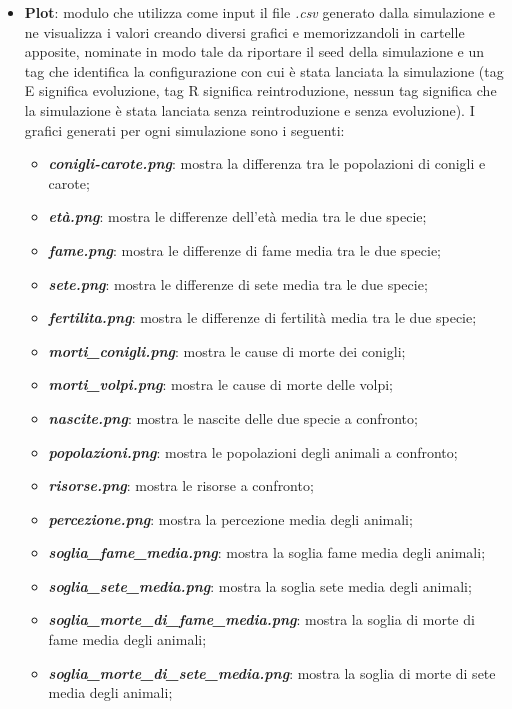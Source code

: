 \documentclass[11pt]{article}
\begin{document}
\begin{itemize}
    \item \textbf{Plot}: modulo che utilizza come input il file \textit{.csv} generato dalla simulazione e ne visualizza i valori creando diversi grafici e memorizzandoli in cartelle apposite, nominate in modo tale da riportare il seed della simulazione e un tag che identifica la configurazione con cui è stata lanciata la simulazione (tag E significa evoluzione, tag R significa reintroduzione, nessun tag significa che la simulazione è stata lanciata senza reintroduzione e senza evoluzione). I grafici generati per ogni simulazione sono i seguenti:
    \begin{itemize}
        \item \textbf{\textit{conigli-carote.png}}: mostra la differenza tra le popolazioni di conigli e carote;
        \item \textbf{\textit{età.png}}: mostra le differenze dell'età media tra le due specie;
        \item \textbf{\textit{fame.png}}: mostra le differenze di fame media tra le due specie;
        \item \textbf{\textit{sete.png}}: mostra le differenze di sete media tra le due specie;
        \item \textbf{\textit{fertilita.png}}: mostra le differenze di fertilità media tra le due specie;
        \item \textbf{\textit{morti\_conigli.png}}: mostra le cause di morte dei conigli;
        \item \textbf{\textit{morti\_volpi.png}}: mostra le cause di morte delle volpi;
        \item \textbf{\textit{nascite.png}}: mostra le nascite delle due specie a confronto;
        \item \textbf{\textit{popolazioni.png}}: mostra le popolazioni degli animali a confronto;
        \item \textbf{\textit{risorse.png}}: mostra le risorse a confronto;
        \item \textbf{\textit{percezione.png}}: mostra la percezione media degli animali;
        \item \textbf{\textit{soglia\_fame\_media.png}}: mostra la soglia fame media degli animali;
        \item \textbf{\textit{soglia\_sete\_media.png}}: mostra la soglia sete media degli animali;
        \item \textbf{\textit{soglia\_morte\_di\_fame\_media.png}}: mostra la soglia di morte di fame media degli animali;
        \item \textbf{\textit{soglia\_morte\_di\_sete\_media.png}}: mostra la soglia di morte di sete media degli animali;

\end{itemize}
\end{itemize}
\end{document}
